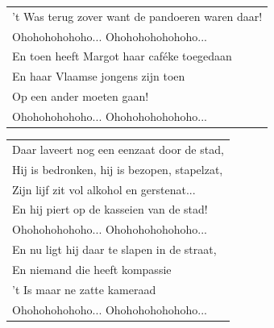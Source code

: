\documentclass{article}
\begin{document}
\begin{flushleft}
\begin{tabularx}{0.8\textwidth} {
   >{\raggedright\arraybackslash}X}
’t Was terug zover want de pandoeren waren daar!\\
Ohohohohohoho... Ohohohohohohoho...\\
En toen heeft Margot haar caféke toegedaan\\
En haar Vlaamse jongens zijn toen\\
Op een ander moeten gaan!\\
Ohohohohohoho... Ohohohohohohoho...\\
\end{tabularx}
\end{flushleft}\begin{flushleft}
\begin{tabularx}{0.8\textwidth} {
   >{\raggedright\arraybackslash}X}
Daar laveert nog een eenzaat door de stad,\\
Hij is bedronken, hij is bezopen, stapelzat,\\
Zijn lijf zit vol alkohol en gerstenat...\\
En hij piert op de kasseien van de stad!\\
Ohohohohohoho... Ohohohohohohoho...\\
En nu ligt hij daar te slapen in de straat,\\
En niemand die heeft kompassie\\
’t Is maar ne zatte kameraad\\
Ohohohohohoho... Ohohohohohohoho...\\
\end{tabularx}
\end{flushleft}
\end{document}
